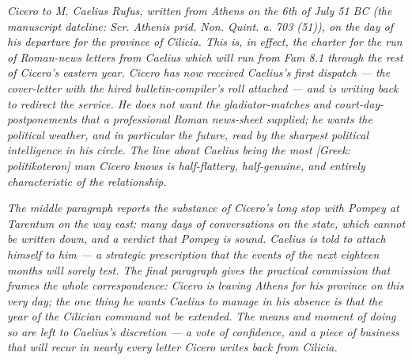 
\textit{Cicero to M. Caelius Rufus, written from Athens
on the 6th of July 51 BC (the manuscript dateline:
\textit{Scr. Athenis prid. Non. Quint. a. 703 (51)}),
on the day of his departure for the province of Cilicia.
This is, in effect, the charter for the run of
Roman-news letters from Caelius which will run from
\textit{Fam} 8.1 through the rest of Cicero's eastern
year. Cicero has now received Caelius's first dispatch
--- the cover-letter with the hired bulletin-compiler's
roll attached --- and is writing back to redirect the
service. He does not want the gladiator-matches and
court-day-postponements that a professional Roman
news-sheet supplied; he wants the political weather, and
in particular the future, read by the sharpest political
intelligence in his circle. The line about Caelius being
the most \textit{[Greek: politikoteron]} man Cicero
knows is half-flattery, half-genuine, and entirely
characteristic of the relationship.}

\textit{The middle paragraph reports the substance of
Cicero's long stop with Pompey at Tarentum on the way
east: many days of conversations on the state, which
cannot be written down, and a verdict that Pompey is
sound. Caelius is told to attach himself to him --- a
strategic prescription that the events of the next
eighteen months will sorely test. The final paragraph
gives the practical commission that frames the whole
correspondence: Cicero is leaving Athens for his
province on this very day; the one thing he wants
Caelius to manage in his absence is that the year of
the Cilician command not be extended. The means and
moment of doing so are left to Caelius's discretion ---
a vote of confidence, and a piece of business that will
recur in nearly every letter Cicero writes back from
Cilicia.}
